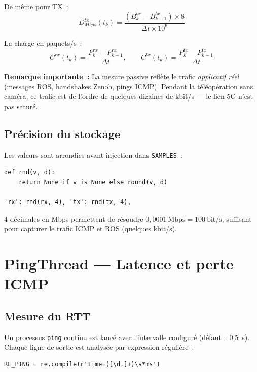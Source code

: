 \documentclass[a4paper,12pt]{article}
\begin{document}
De même pour TX~:
\begin{equation}
  D^{tx}_{Mbps}(t_k) = \frac{(B^{tx}_k - B^{tx}_{k-1}) \times 8}{\Delta t \times 10^6}
\end{equation}

La charge en paquets/s~:
\begin{equation}
  C^{rx}(t_k) = \frac{P^{rx}_k - P^{rx}_{k-1}}{\Delta t}, \qquad
  C^{tx}(t_k) = \frac{P^{tx}_k - P^{tx}_{k-1}}{\Delta t}
\end{equation}

\textbf{Remarque importante~:} La mesure passive reflète le trafic \emph{applicatif réel}
(messages ROS, handshakes Zenoh, pings ICMP). Pendant la téléopération sans caméra, ce
trafic est de l'ordre de quelques dizaines de kbit/s — le lien 5G n'est pas saturé.

\subsection{Précision du stockage}

Les valeurs sont arrondies avant injection dans \texttt{SAMPLES}~:

\begin{lstlisting}
def rnd(v, d):
    return None if v is None else round(v, d)

'rx': rnd(rx, 4), 'tx': rnd(tx, 4),
\end{lstlisting}

4 décimales en Mbps permettent de résoudre $0{,}0001\ \text{Mbps} = 100\ \text{bit/s}$,
suffisant pour capturer le trafic ICMP et ROS (quelques kbit/s).

\section{PingThread — Latence et perte ICMP}

\subsection{Mesure du RTT}

Un processus \texttt{ping} continu est lancé avec l'intervalle configuré (défaut~: 0,5~s).
Chaque ligne de sortie est analysée par expression régulière~:

\begin{lstlisting}
RE_PING = re.compile(r'time=([\d.]+)\s*ms')
\end{lstlisting}
\end{document}
